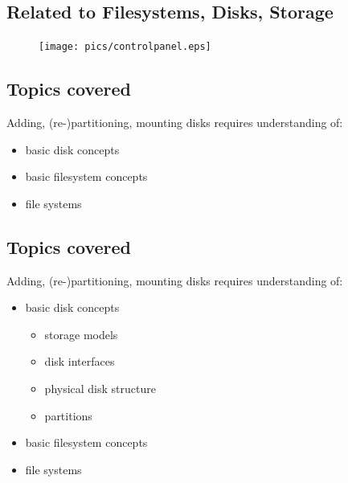 \documentclass[xga]{xdvislides}
\begin{document}
\subsection{Related to Filesystems, Disks, Storage}
\begin{figure}[hb]
	\begin{center}
		\texttt{[image: pics/controlpanel.eps]} \\
	\end{center}
\end{figure}



\subsection{Topics covered}
Adding, (re-)partitioning, mounting disks requires understanding of:
\begin{itemize}
	\item basic disk concepts
	\item basic filesystem concepts
	\item file systems
\end{itemize}

\subsection{Topics covered}
Adding, (re-)partitioning, mounting disks requires understanding of:
\begin{itemize}
	\item basic disk concepts
		\begin{itemize}
			\item storage models
			\item disk interfaces
			\item physical disk structure
			\item partitions
		\end{itemize}
	\item basic filesystem concepts
	\item file systems
\end{itemize}
\end{document}
